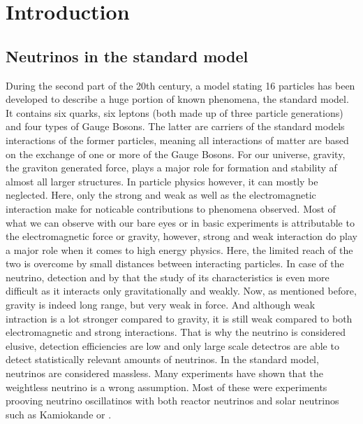 
\chapter{Introduction}
\label{ch:Introduction}
    \section{Neutrinos in the standard model}
    \label{ch:Introduction:sec:Neutrinos in the standard model}
    During the second part of the 20th century, a model stating 16 particles has been developed to describe a huge portion of known phenomena, the standard model. It contains six quarks, six leptons (both made up of three particle generations) and four types of Gauge Bosons. The latter are carriers of the standard models interactions of the former particles, meaning all interactions of matter are based on the exchange of one or more of the Gauge Bosons. 
    For our universe, gravity, the graviton generated force, plays a major role for formation and stability af almost all larger structures. In particle physics however, it can mostly be neglected. Here, only the strong and weak as well as the electromagnetic interaction make for noticable contributions to phenomena observed.
    Most of what we can observe with our bare eyes or in basic experiments is attributable to the electromagnetic force or gravity, however, strong and weak interaction do play a major role when it comes to high energy physics. Here, the limited reach of the two is overcome by small distances between interacting particles. In case of the neutrino, detection and by that the study of its characteristics is even more difficult as it interacts only gravitationally and weakly. Now, as mentioned before, gravity is indeed long range, but very weak in force. And although weak intraction is a lot stronger compared to gravity, it is still weak compared to both electromagnetic and strong interactions. That is why the neutrino is considered elusive, detection efficiencies are low and only large scale detectros are able to detect statistically relevant amounts of neutrinos.
    In the standard model, neutrinos are considered massless. 
    Many experiments have shown that the weightless neutrino is a wrong assumption. Most of these were experiments prooving neutrino oscillatinos with both reactor neutrinos and solar neutrinos such as Kamiokande\cite{PhysRevLett.110.181802} or .
    
